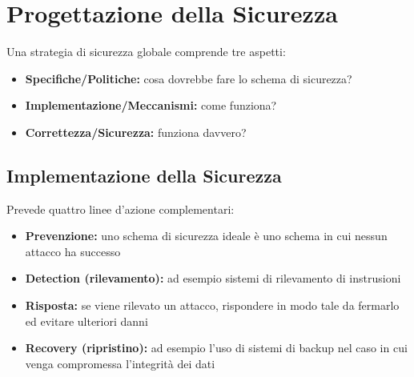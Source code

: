 \section{Progettazione della Sicurezza}

Una strategia di sicurezza globale comprende tre aspetti:
\begin{itemize}
    \item \textbf{Specifiche/Politiche:} cosa dovrebbe fare lo schema di sicurezza?
    \item \textbf{Implementazione/Meccanismi:} come funziona?
    \item \textbf{Correttezza/Sicurezza:} funziona davvero?
\end{itemize}

\subsection{Implementazione della Sicurezza}

Prevede quattro linee d'azione complementari:
\begin{itemize}
    \item \textbf{Prevenzione:} uno schema di sicurezza ideale è uno schema in cui nessun attacco ha successo
    \item \textbf{Detection (rilevamento):} ad esempio sistemi di rilevamento di instrusioni
    \item \textbf{Risposta:} se viene rilevato un attacco, rispondere in modo tale da fermarlo ed evitare ulteriori danni 
    \item \textbf{Recovery (ripristino):} ad esempio l'uso di sistemi di backup nel caso in cui venga compromessa l'integrità dei dati
\end{itemize}



